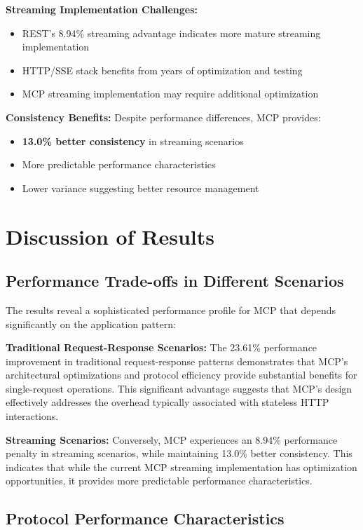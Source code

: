 \textbf{Streaming Implementation Challenges:}
\begin{itemize}
    \item REST's 8.94\% streaming advantage indicates more mature streaming implementation
    \item HTTP/SSE stack benefits from years of optimization and testing
    \item MCP streaming implementation may require additional optimization
\end{itemize}

\textbf{Consistency Benefits:}
Despite performance differences, MCP provides:
\begin{itemize}
    \item \textbf{13.0\% better consistency} in streaming scenarios
    \item More predictable performance characteristics
    \item Lower variance suggesting better resource management
\end{itemize}

\section{Discussion of Results}

\subsection{Performance Trade-offs in Different Scenarios}

The results reveal a sophisticated performance profile for MCP that depends significantly on the application pattern:

\textbf{Traditional Request-Response Scenarios:}
The 23.61\% performance improvement in traditional request-response patterns demonstrates that MCP's architectural optimizations and protocol efficiency provide substantial benefits for single-request operations. This significant advantage suggests that MCP's design effectively addresses the overhead typically associated with stateless HTTP interactions.

\textbf{Streaming Scenarios:}
Conversely, MCP experiences an 8.94\% performance penalty in streaming scenarios, while maintaining 13.0\% better consistency. This indicates that while the current MCP streaming implementation has optimization opportunities, it provides more predictable performance characteristics.

\subsection{Protocol Performance Characteristics}

